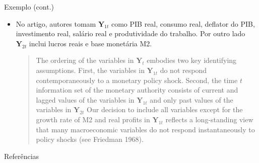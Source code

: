 \documentclass[11pt]{beamer}
\begin{document}
\begin{frame}{Exemplo (cont.)}
\begin{itemize}
	\item No artigo, autores tomam $\boldsymbol{Y}_{1t}$ como PIB real, consumo real, deflator do PIB, investimento real, salário real e produtividade do trabalho. Por outro lado $\boldsymbol{Y}_{2t}$ inclui lucros reais e base monetária M2.
	
	\vspace{1em}
	\begin{quote}
		The ordering of the variables in \(\boldsymbol{Y}_{t}\) embodies two key identifying assumptions. First, the variables in \(\boldsymbol{Y}_{1 t}\) do not respond contemporaneously to a monetary policy shock. Second, the time \(t\) information set of the
		monetary authority consists of current and lagged values of the variables
		in \(\boldsymbol{Y}_{1 t}\) and only past values of the variables in \(\boldsymbol{Y}_{2 t}\)
		Our decision to include all variables except for the growth rate of
		M2 and real profits in \(\boldsymbol{Y}_{1 t}\) reflects a long-standing view that many macroeconomic variables do not respond instantaneously to policy shocks
		(see Friedman 1968).
	\end{quote}
\end{itemize}
\end{frame}
\appendix
\begin{frame}[allowframebreaks]{Referências}
	\printbibliography
\end{frame}
\end{document}
